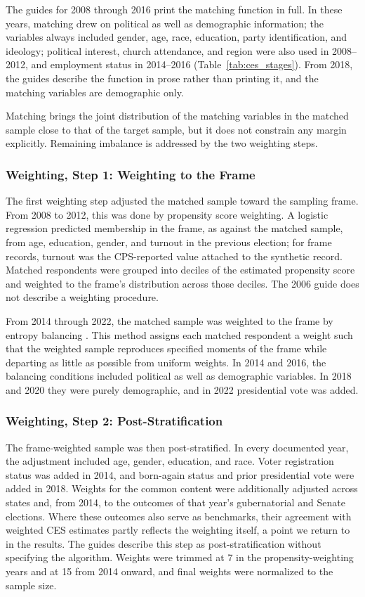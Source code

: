\documentclass[12pt]{article}
\begin{document}
The guides for 2008 through 2016 print the matching function in full. In these years, matching drew on political as well as demographic information; the variables always included gender, age, race, education, party identification, and ideology; political interest, church attendance, and region were also used in 2008--2012, and employment status in 2014--2016 (Table~\ref{tab:ces_stages}). From 2018, the guides describe the function in prose rather than printing it, and the matching variables are demographic only.

Matching brings the joint distribution of the matching variables in the matched sample close to that of the target sample, but it does not constrain any margin explicitly. Remaining imbalance is addressed by the two weighting steps.

\subsubsection*{Weighting, Step 1: Weighting to the Frame}
The first weighting step adjusted the matched sample toward the sampling frame. From 2008 to 2012, this was done by propensity score weighting. A logistic regression predicted membership in the frame, as against the matched sample, from age, education, gender, and turnout in the previous election; for frame records, turnout was the CPS-reported value attached to the synthetic record. Matched respondents were grouped into deciles of the estimated propensity score and weighted to the frame's distribution across those deciles. The 2006 guide does not describe a weighting procedure.
 
From 2014 through 2022, the matched sample was weighted to the frame by entropy balancing \parencite{hainmueller_entropy_2012}. This method assigns each matched respondent a weight such that the weighted sample reproduces specified moments of the frame while departing as little as possible from uniform weights. In 2014 and 2016, the balancing conditions included political as well as demographic variables. In 2018 and 2020 they were purely demographic, and in 2022 presidential vote was added. 


\subsubsection*{Weighting, Step 2: Post-Stratification}
The frame-weighted sample was then post-stratified. In every documented year, the adjustment included age, gender, education, and race. Voter registration status was added in 2014, and born-again status and prior presidential vote were added in 2018. Weights for the common content were additionally adjusted across states and, from 2014, to the outcomes of that year's gubernatorial and Senate elections. Where these outcomes also serve as benchmarks, their agreement with weighted CES estimates partly reflects the weighting itself, a point we return to in the results. The guides describe this step as post-stratification without specifying the algorithm. Weights were trimmed at 7 in the propensity-weighting years and at 15 from 2014 onward, and final weights were normalized to the sample size.
\end{document}
